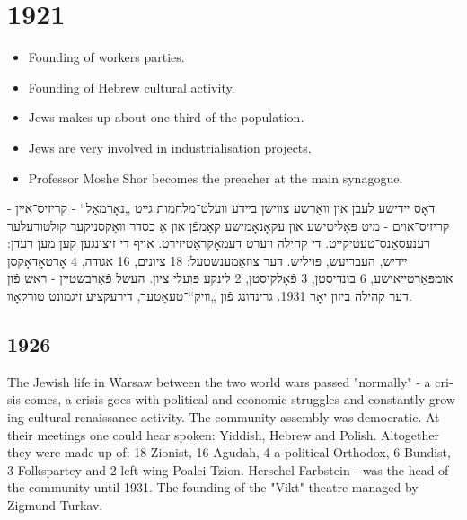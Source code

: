 \documentclass{article}
\begin{document}
\section { 1921 }
\begin{itemize}
\item Founding of workers parties.
\item Founding of Hebrew cultural activity.
\item Jews makes up about one third of the population.
\item Jews are very involved in industrialisation projects.
\item Professor Moshe Shor becomes the preacher at the main synagogue.
\end{itemize}
\begin{pairs}

\begin{Rightside}

\begin{RTL}
\begin{hebrew}
\beginnumbering

\autopar

דאָס ײדישע לעבן אין װאַרשע צװישן בײדע װעלט־מלחמות גײט „נאָרמאַל“
- קריזיס־אײן - קריזיס־אוים - מיט פּאַליטישע און עקאָנאָמישע קאַמפֿן
און אַ כסדר װאַקסניקער קולטורעלער רענעסאַנס־טעטיקײט.
די קהילה װערט דעמאָקראַטיזירט. אויף די זיצונגען קען מען רעדן: ײדיש, העבריעש, פּויליש.
דער צוזאַמענשטעל: 18 ציונים, 16 אגודה, 4 אָרטאָדאָקסן אומפּאַרטײאישע, 6 בונדיסטן, 3 פֿאָלקיסטן, 2 לינקע פּועלי ציון.
העשל פֿאַרבשטײן - ראש פֿון דער קהילה ביזון יאָר 1931. גרינדונג פֿון „װיק“־טעאַטער, דירעקציע זיגמונט טורקאָװ.

\endnumbering
\end{hebrew}
\end{RTL}
\end{Rightside}


\begin{Leftside}
\begin{english}
\section{ 1926  }
\beginnumbering
\autopar

The Jewish life in Warsaw between the two world wars passed "normally" - a crisis comes, a crisis goes with political and economic struggles and constantly growing cultural renaissance activity.  
The community assembly was democratic. At their meetings one could hear spoken: Yiddish,
Hebrew and Polish.
Altogether they were made up of: 18 Zionist, 16 Agudah, 4 a-political Orthodox, 6 Bundist, 3 Folkspartey 
and 2 left-wing Poalei Tzion.
Herschel Farbstein - was the head of the community until 1931. 
The founding of the "Vikt" theatre managed by Zigmund Turkav.

\endnumbering
\end{english}
\end{Leftside}
\end{pairs}
\Columns
\end{document}
